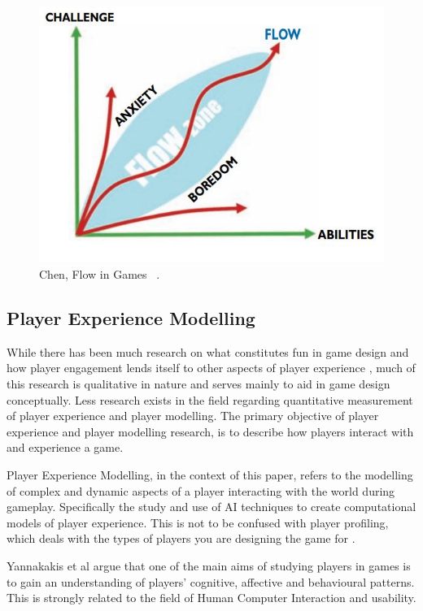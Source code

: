 \documentclass[journal]{IEEEtran}
\begin{document}
\begin{figure}[h]
	\includegraphics[width=1.0\linewidth]{FlowChart.jpg}
	\caption{Chen, Flow in Games ~\cite{Chen:2007:FG:1232743.1232769}.}
	\label{fig::1}
\end{figure} 


\subsection{Player Experience Modelling}

While there has been much research on what constitutes fun in game design and how player engagement lends itself to other aspects of player experience \cite{salen2004rules} \cite{koster2013theory}, much of this research is qualitative in nature and serves mainly to aid in game design conceptually. Less research exists in the field regarding quantitative measurement of player experience and player modelling. The primary objective of player experience and player modelling research, is to describe how players interact with and experience a game. 

Player Experience Modelling, in the context of this paper, refers to the modelling of complex and dynamic aspects of a player interacting with the world during gameplay. Specifically the study and use of AI techniques to create computational models of player experience. This is not to be confused with player profiling, which deals with the types of players you are designing the game for \cite{bartle1996hearts}. 

Yannakakis et al \cite{yannakakis2013player} argue that one of the main aims of studying players in games is to gain an understanding of players' cognitive, affective and behavioural patterns. This is strongly related to the field of Human Computer Interaction \cite{preece1994human} \cite{fischer2001user} and usability. 
\end{document}
